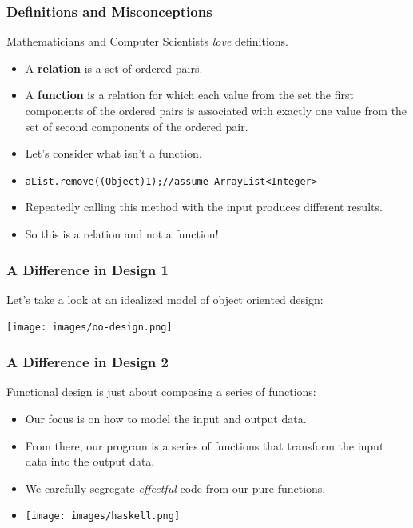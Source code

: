 \documentclass{beamer}
\begin{document}
\begin{frame}
  \frametitle{Definitions and Misconceptions}
  Mathematicians and Computer Scientists \emph{love} definitions.
  \begin{itemize}
    \item<2-> A \textbf{relation} is a set of ordered pairs.
    \item<3-> A \textbf{function} is a relation for which each value from the set the first components of the ordered pairs is associated with exactly one value from the set of second components of the ordered pair.
    \item<4-> Let's consider what isn't a function.
    \item<5-> \texttt{aList.remove((Object)1);//assume ArrayList<Integer>}
    \item<6-> Repeatedly calling this method with the input produces
      different results.
    \item<7-> So this is a relation and not a function!
  \end{itemize}
\end{frame}

\begin{frame}
  \frametitle{A Difference in Design 1}
  Let's take a look at an idealized model of object oriented design:
  \pause
  \begin{center}
    \texttt{[image: images/oo-design.png]}
  \end{center}
\end{frame}

\begin{frame}
  \frametitle{A Difference in Design 2}
  Functional design is just about composing a series of functions:
  \pause
  \begin{itemize}
  \item<2-> Our focus is on how to model the input and output data.
  \item<3-> From there, our program is a series of functions that transform
    the input data into the output data.
  \item<4-> We carefully segregate \emph{effectful} code from our pure functions.
  \item<5-> \texttt{[image: images/haskell.png]}
  \end{itemize}
      
\end{frame}
\end{document}
